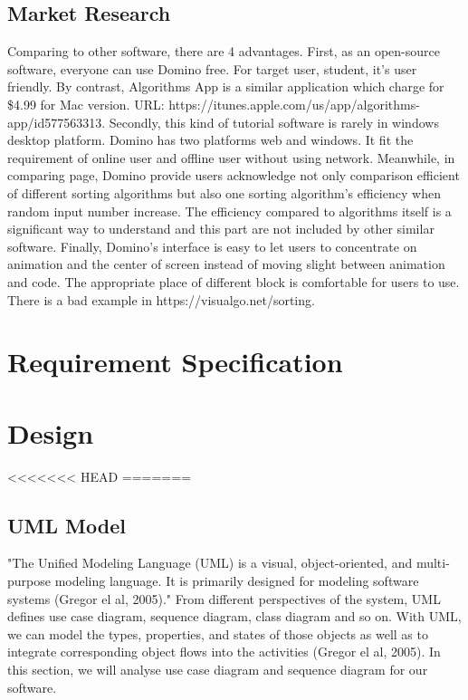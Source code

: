 \documentclass[paper=a4, fontsize=11pt,twoside]{scrartcl}		%
\begin{document}
\subsection{Market Research}
Comparing to other software, there are 4 advantages. First, as an open-source software, everyone can use Domino free. For target user, student, it’s user friendly. By contrast, Algorithms App is a similar application which charge for \$4.99 for Mac version. URL: https://itunes.apple.com/us/app/algorithms-app/id577563313. Secondly, this kind of tutorial software is rarely in windows desktop platform. Domino has two platforms web and windows. It fit the requirement of online user and offline user without using network. Meanwhile, in comparing page, Domino provide users acknowledge not only comparison efficient of different sorting algorithms but also one sorting algorithm’s efficiency when random input number increase. The efficiency compared to algorithms itself is a significant way to understand and this part are not included by other similar software. Finally, Domino’s interface is easy to let users to concentrate on animation and the center of screen instead of moving slight between animation and code. The appropriate place of different block is comfortable for users to use. There is a bad example in https://visualgo.net/sorting.



\section{Requirement Specification}
\clearpage

\section{Design}
<<<<<<< HEAD
=======
\subsection{UML Model}
"The Unified Modeling Language (UML) is a visual, object-oriented, and multi-purpose modeling language. It is primarily designed for modeling software systems (Gregor el al, 2005)." From different perspectives of the system, UML defines use case diagram, sequence diagram, class diagram and so on. With UML, we can model the types, properties, and states of those objects as well as to integrate corresponding object flows into the activities (Gregor el al, 2005). In this section, we will analyse use case diagram and sequence diagram for our software.
\end{document}
